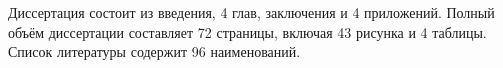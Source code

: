 {\struct} Диссертация состоит из введения, 4 глав, заключения и 4 приложений. Полный объём диссертации составляет 72 страницы, включая 43 рисунка и 4 таблицы. Список литературы содержит 96 наименований.


